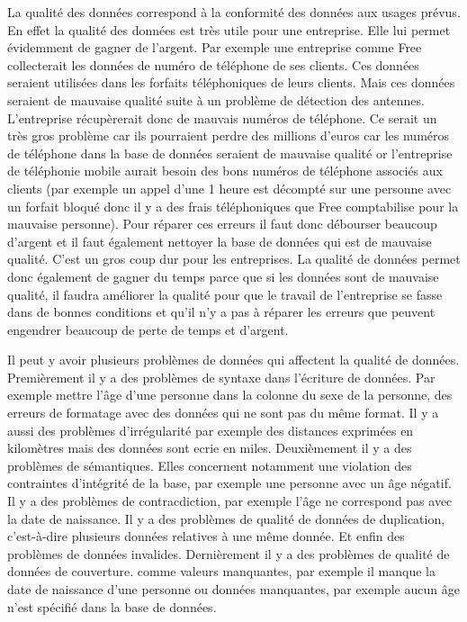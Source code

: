 \documentclass[12pt, a4paper]{article}
\begin{document}
La qualité des données correspond à la conformité des données aux usages prévus. En effet la qualité des données est très utile pour une entreprise. Elle lui permet évidemment de gagner de l'argent. Par exemple une entreprise comme Free collecterait les données de numéro de téléphone de ses clients. Ces données seraient utilisées dans les forfaits téléphoniques de leurs clients. Mais ces données seraient de mauvaise qualité suite à un problème de détection des antennes. L'entreprise récupèrerait donc de mauvais numéros de téléphone. Ce serait un très gros problème car ils pourraient perdre des millions d'euros car les numéros de téléphone dans la base de données seraient de mauvaise qualité or l'entreprise de téléphonie mobile aurait besoin des bons numéros de téléphone associés aux clients (par exemple un appel d'une 1 heure est décompté sur une personne avec un forfait bloqué donc il y a des frais téléphoniques que Free comptabilise pour la mauvaise personne). Pour réparer ces erreurs il faut donc débourser beaucoup d'argent et il faut également nettoyer la base de données qui est de mauvaise qualité. C'est un gros coup dur pour les entreprises. La qualité de données permet donc également de gagner du temps parce que si les données sont de mauvaise qualité, il faudra améliorer la qualité pour que le travail de l'entreprise se fasse dans de bonnes conditions et qu'il n'y a pas à réparer les erreurs que peuvent engendrer beaucoup de perte de temps et d'argent.

Il peut y avoir plusieurs problèmes de données qui affectent la qualité de données. 
Premièrement il y a des problèmes de syntaxe dans l'écriture de données. Par exemple mettre l'âge d'une personne dans la colonne du sexe de la personne, des erreurs de formatage avec des données qui ne sont pas du même format. Il y a aussi des problèmes d'irrégularité par exemple des distances exprimées en kilomètres mais des données sont ecrie en miles.
Deuxièmement il y a des problèmes de sémantiques.
Elles concernent notamment une violation des contraintes d'intégrité de la base, par exemple une personne avec un âge négatif.
Il y a des problèmes de contracdiction, par exemple l'âge ne correspond pas avec la date de naissance.
Il y a des problèmes de qualité de données de duplication, c'est-à-dire plusieurs données relatives à une même donnée.
Et enfin des problèmes de données invalides.
Dernièrement il y a des problèmes de qualité de données de couverture.
comme valeurs manquantes, par exemple il manque la date de naissance d'une personne ou données manquantes, par exemple aucun âge n'est spécifié dans la base de données.
\end{document}
